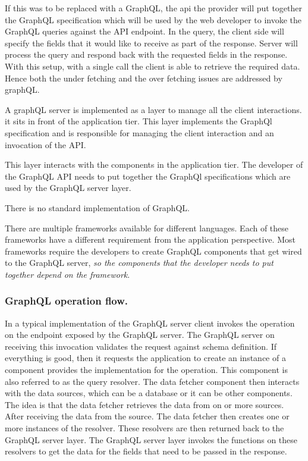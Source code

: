 If this was to be replaced with a GraphQL, the api the provider will put together the GraphQL specification which will be used by the web developer to invoke the GraphQL queries against the API endpoint.
In the query, the client side will specify the fields that it would like to receive as part of the response.
Server will process the query and respond back with the requested fields in the response.
With this setup, with a single call the client is able to retrieve the required data.
Hence both the under fetching and the over fetching issues are addressed by graphQL.

A graphQL server is implemented as a layer to manage all the client interactions.
it sits in front of the application tier.
This layer implements the GraphQl specification and is responsible for managing the client interaction and an invocation of the API.

This layer interacts with the components in the application tier.
The developer of the GraphQL API needs to put together the GraphQl specifications which are used by the GraphQL server layer.

\begin{note}
    There is no standard implementation of GraphQL.
\end{note}

There are multiple frameworks available for different languages.
Each of these frameworks have a different requirement from the application perspective.
Most frameworks require the developers to create GraphQL components that get wired to the GraphQL server, \textit{so the components that the developer needs to put together depend on the framework}.

\subsubsection{GraphQL operation flow.}
In a typical implementation of the GraphQL server client invokes the operation on the endpoint exposed by the GraphQL server.
The GraphQL server on receiving this invocation validates the request against schema definition.
If everything is good, then it requests the application to create an instance of a component provides the implementation for the operation.
This component is also referred to as the query resolver.
The data fetcher component then interacts with the data sources, which can be a database or it can be other components.
The idea is that the data fetcher retrieves the data from on or more sources.
After receiving the data from the source.
The data fetcher then creates one or more instances of the resolver.
These resolvers are then returned back to the GraphQL server layer.
The GraphQL server layer invokes the functions on these resolvers to get the data for the fields that need to be passed in the response.

